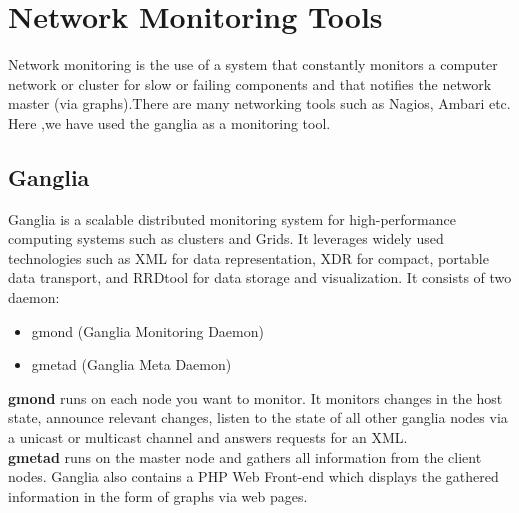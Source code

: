 \documentclass[12pt]{book}
\begin{document}
\section{Network Monitoring Tools}
Network monitoring is the use of a system that constantly monitors a computer network or cluster for slow or failing components and that notifies the network 
master (via graphs).There are many networking tools such as Nagios, Ambari etc.
Here ,we have used the ganglia as a monitoring tool.
\subsection{Ganglia}
Ganglia is a scalable distributed monitoring system for high-performance computing systems such as clusters and Grids.
It leverages widely used technologies such as XML for data representation, XDR for compact, 
portable data transport, and RRDtool for data storage and visualization.
It consists of two daemon:
\begin{itemize}
 \item gmond (Ganglia Monitoring Daemon)
 \item gmetad (Ganglia Meta Daemon)
 \end{itemize}
\textbf{gmond} runs on each node you want to monitor. It monitors changes in the host state,
announce relevant changes, listen to the state of all other ganglia nodes via a unicast or
multicast channel and answers requests for an XML.\\
\textbf{gmetad} runs on the master node and gathers all information from the client nodes.
Ganglia also contains a PHP Web Front-end which displays the gathered information in
the form of graphs via web pages.
\\\noindent
\end{document}
